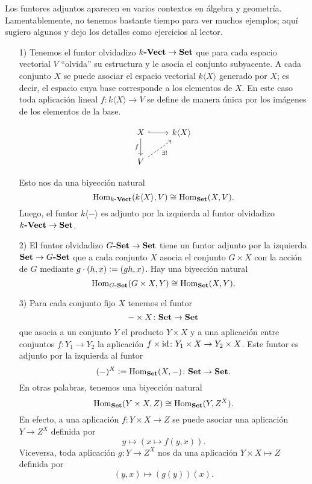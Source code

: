 \documentclass{article}
\numberwithin{equation}{section}
\theoremstyle{definition}
\begin{document}
\begin{ejemplo}
  Los funtores adjuntos aparecen en varios contextos en álgebra y
  geometría. Lamentablemente, no tenemos bastante tiempo para ver muchos
  ejemplos; aquí sugiero algunos y dejo los detalles como ejercicios al lector.

  \begin{enumerate}
  \item[1)] Tenemos el funtor olvidadizo $k\text{\bf -Vect} \to \text{\bf Set}$ que
    para cada espacio vectorial $V$ ``olvida'' su estructura y le asocia el
    conjunto subyacente. A cada conjunto $X$ se puede asociar el espacio
    vectorial $k\langle X\rangle$ generado por $X$; es decir, el espacio cuya
    base corresponde a los elementos de $X$. En este caso toda aplicación lineal
    $f\colon k \langle X\rangle\to V$ se define de manera única por los imágenes
    de los elementos de la base.

    \[ \begin{tikzcd}
        X \ar[hookrightarrow]{r}\ar{d}[swap]{f} & k\langle X\rangle \\
        V\ar[dashed]{ur}[swap]{\exists !}
      \end{tikzcd} \]

    Esto nos da una biyección natural
    $$\operatorname{Hom}_{k\text{\bf -Vect}} (k \langle X\rangle, V) \cong \operatorname{Hom}_{\text{\bf Set}} (X,V).$$
    Luego, el funtor $k \langle -\rangle$ es adjunto por la izquierda al funtor
    olvidadizo $k\text{\bf -Vect} \to \text{\bf Set}$.

  \item[2)] El funtor olvidadizo $G\text{\bf -Set}\to \text{\bf Set}$ tiene un funtor
    adjunto por la izquierda $\text{\bf Set}\to G\text{\bf -Set}$ que a cada conjunto
    $X$ asocia el conjunto $G\times X$ con la acción de $G$ mediante
    $g\cdot (h,x) \mathrel{\mathop:}= (gh, x)$. Hay una biyección natural
    $$\operatorname{Hom}_{G\text{\bf -Set}} (G\times X, Y) \cong \operatorname{Hom}_{\text{\bf Set}} (X, Y).$$

  \item[3)] Para cada conjunto fijo $X$ tenemos el funtor
  $$-\times X\colon \text{\bf Set} \to \text{\bf Set}$$
  que asocia a un conjunto $Y$ el producto $Y\times X$ y a una aplicación entre
  conjuntos $f\colon Y_1\to Y_2$ la aplicación
  $f\times\mathrm{id}\colon Y_1\times X\to Y_2\times X$. Este funtor es adjunto por la
  izquierda al funtor
  $$(-)^X \mathrel{\mathop:}= \operatorname{Hom}_{\text{\bf Set}} (X,-)\colon \text{\bf Set} \to \text{\bf Set}.$$
  En otras palabras, tenemos una biyección natural
  $$\operatorname{Hom}_{\text{\bf Set}} (Y\times X, Z) \cong \operatorname{Hom}_{\text{\bf Set}} (Y, Z^X).$$
  En efecto, a una aplicación $f\colon Y\times X\to Z$ se puede asociar una aplicación $Y\to Z^X$ definida por
  $$y \mapsto (x \mapsto f (y,x)).$$
  Viceversa, toda aplicación $g\colon Y\to Z^X$ nos da una aplicación $Y\times X\mapsto Z$ definida por
  $$(y,x) \mapsto (g (y)) (x).$$


\end{enumerate}
\end{ejemplo}
\end{document}
